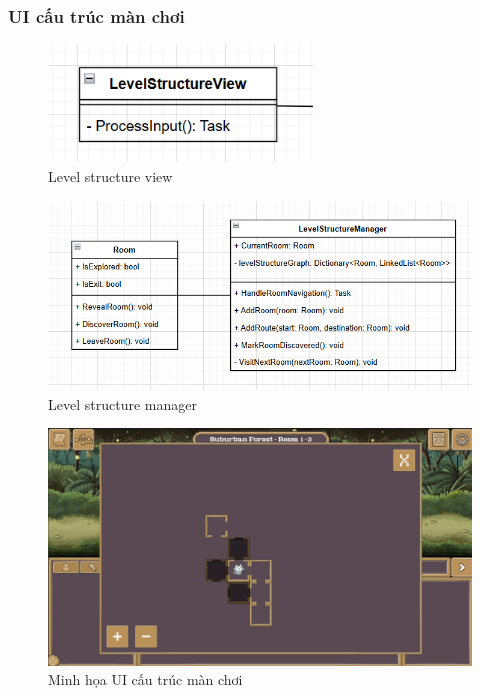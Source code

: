 \subsubsection{UI cấu trúc màn chơi}
\begin{figure}[H]
	\centering
	\includegraphics[width=7cm]{Images/LevelStructureView.png}
	\vspace{0.5cm}
	\caption{Level structure view}
\end{figure}

\begin{figure}[H]
	\centering
	\includegraphics[width=13cm]{Images/LevelStructureManager.png}
	\vspace{0.5cm}
	\caption{Level structure manager}
\end{figure}

\begin{figure}[H]
	\centering
	\includegraphics[width=13cm]{Images/LevelStructureUI.png}
	\vspace{0.5cm}
	\caption{Minh họa UI cấu trúc màn chơi}
\end{figure}

